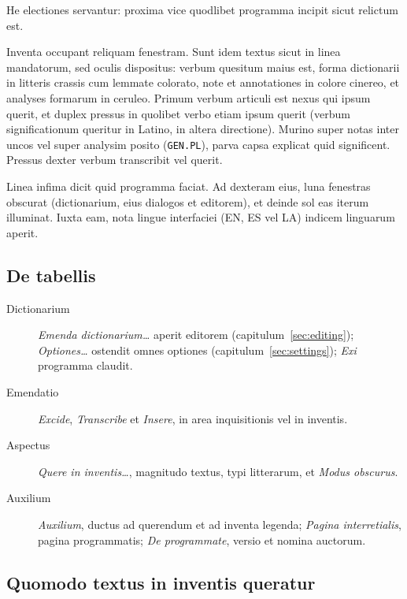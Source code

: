 \documentclass[12pt,
              article,
              oneside
              ]{memoir}
\newcommand*{\menu}[1]{\textit{#1}}
\begin{document}
\noindent
He electiones servantur: proxima vice quodlibet programma incipit sicut
relictum est.

%
Inventa occupant reliquam fenestram. Sunt idem textus sicut in linea
mandatorum, sed oculis dispositus: verbum quesitum maius est, forma
dictionarii in litteris crassis cum lemmate colorato, note et
annotationes in colore cinereo, et analyses formarum in ceruleo. Primum
verbum articuli est nexus qui ipsum querit, et duplex pressus in
quolibet verbo etiam ipsum querit (verbum significationum queritur in
Latino, in altera directione). Murino super notas inter uncos vel super
analysim posito (\texttt{GEN.PL}), parva capsa explicat quid significent.
Pressus dexter verbum transcribit vel querit.

%
Linea infima dicit quid programma faciat. Ad dexteram eius, luna fenestras
obscurat (dictionarium, eius dialogos et editorem), et deinde sol eas
iterum illuminat. Iuxta eam, nota lingue interfaciei (EN, ES vel LA)
indicem linguarum aperit.

\subsection{De tabellis}

%
\begin{description}
\item[Dictionarium] \menu{Emenda dictionarium\ldots} aperit editorem
  (capitulum~\ref{sec:editing}); \menu{Optiones\ldots} ostendit omnes
  optiones (capitulum~\ref{sec:settings}); \menu{Exi} programma claudit.
\item[Emendatio] \menu{Excide}, \menu{Transcribe} et \menu{Insere}, in area
  inquisitionis vel in inventis.
\item[Aspectus] \menu{Quere in inventis\ldots}, magnitudo textus, typi
  litterarum, et \menu{Modus obscurus}.
\item[Auxilium] \menu{Auxilium}, ductus ad querendum et ad inventa legenda;
  \menu{Pagina interretialis}, pagina programmatis; \menu{De programmate}, versio et nomina
  auctorum.
\end{description}

\subsection{Quomodo textus in inventis queratur}
\end{document}
